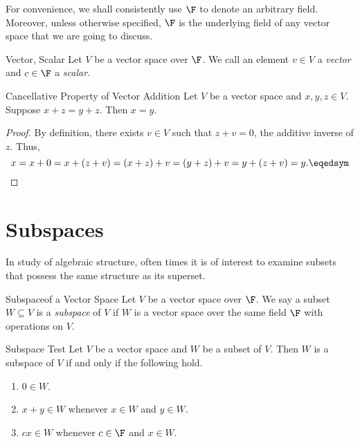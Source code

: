 \documentclass[linearalgebra]{subfiles}
\begin{document}
    \begin{remark}
        For convenience, we shall consistently use $\F$ to denote an arbitrary field. Moreover, unless otherwise specified, $\F$ is the underlying field of any vector space that we are going to discuss.
    \end{remark}

    \begin{definition}{Vector, Scalar}{}
        Let $V$ be a vector space over $\F$. We call an element $v\in V$ a \emph{vector} and $c\in\F$ a \emph{scalar}.
    \end{definition}

    \begin{prop}{Cancellative Property of Vector Addition}
        Let $V$ be a vector space and $x, y, z\in V$. Suppose $x+z = y+z$. Then $x=y$.
    \end{prop}

    \begin{proof}
        By definition, there exists $v\in V$ such that $z+v=0$, the additive inverse of $z$. Thus,
        \begin{equation*}
            x = x+0 = x + (z+v) = (x+z) + v = (y+z) + v = y + (z+v) = y. \eqedsym
        \end{equation*}
    \end{proof}


    \section{Subspaces}

    \begin{remark}
        In study of algebraic structure, often times it is of interest to examine subsets that possess the same structure as its superset. 
    \end{remark}

    \begin{definition}{Subspace}{of a Vector Space}
        Let $V$ be a vector space over $\F$. We say a subset $W\subseteq V$ is a \emph{subspace} of $V$ if $W$ is a vector space over the same field $\F$ with operations on $V$.
    \end{definition}

    \begin{prop}{Subspace Test}
        Let $V$ be a vector space and $W$ be a subset of $V$. Then $W$ is a subspace of $V$ if and only if the following hold.
        \begin{enumerate}
            \item $0\in W$.
            \item $x+y\in W$ whenever $x\in W$ and $y\in W$.
            \item $cx\in W$ whenever $c\in \F$ and $x\in W$.
        \end{enumerate}
    \end{prop}
\end{document}
